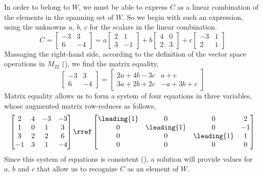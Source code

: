 In order to belong to $W$, we must be able to express $C$ as a linear combination of the elements in the spanning set of $W$.  So we begin with such an expression, using the unknowns $a,\,b,\,c$ for the scalars in the linear combination.
%
\begin{equation*}
C=
\begin{bmatrix}
-3 & 3\\6 & -4
\end{bmatrix}
=
a
\begin{bmatrix}
2 & 1\\3 & -1
\end{bmatrix}
+b
\begin{bmatrix}
4 & 0\\2 & 3
\end{bmatrix}
+c
\begin{bmatrix}
-3 & 1\\2 & 1
\end{bmatrix}
\end{equation*}
%
Massaging the right-hand side, according to the definition of the vector space operations in $M_{22}$ (), we find the matrix equality,
%
\begin{equation*}
\begin{bmatrix}
-3 & 3\\6 & -4
\end{bmatrix}
=
\begin{bmatrix}
2a+4b-3c & a+c\\ 3a+2b+2c & -a+3b+c
\end{bmatrix}
\end{equation*}
%
Matrix equality allows us to form a system of four equations in three variables, whose augmented matrix row-reduces as follows,
%
\begin{equation*}
\begin{bmatrix}
 2 & 4 & -3 & -3 \\
 1 & 0 & 1 & 3 \\
 3 & 2 & 2 & 6 \\
 -1 & 3 & 1 & -4
\end{bmatrix}
\rref
\begin{bmatrix}
 \leading{1} & 0 & 0 & 2 \\
 0 & \leading{1} & 0 & -1 \\
 0 & 0 & \leading{1} & 1 \\
 0 & 0 & 0 & 0
\end{bmatrix}
\end{equation*}
%
Since this system of equations is consistent (), a solution will provide values for $a,\,b$ and $c$ that allow us to recognize $C$ as an element of $W$.